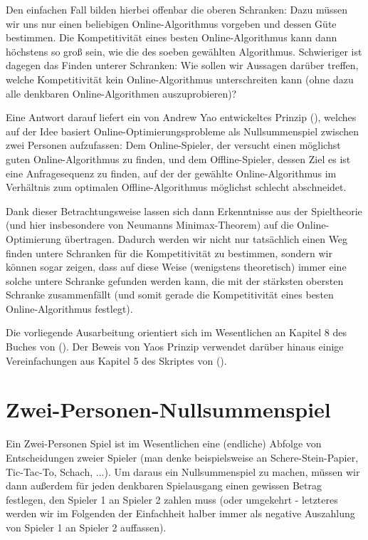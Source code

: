 \documentclass[a4paper,ngerman,12pt,bibtotoc]{scrartcl}
\theoremstyle{definition}
\newtheorem{bsp}[defn]{Beispiel}
\theoremstyle{plain}
\theoremstyle{remark}
\renewcommand{\_}{\mathpunct{.}\,}
\newcommand{\?}{\,{:}\,}
\newcommand{\ZPNS}{Zwei-Personen-Nullsummenspiel }
\begin{document}
	Den einfachen Fall bilden hierbei offenbar die oberen Schranken: Dazu müssen wir uns nur einen beliebigen Online-Algorithmus vorgeben und dessen Güte bestimmen. Die Kompetitivität eines besten Online-Algorithmus kann dann höchstens so groß sein, wie die des soeben gewählten Algorithmus. Schwieriger ist dagegen das Finden unterer Schranken: Wie sollen wir Aussagen darüber treffen, welche Kompetitivität kein Online-Algorithmus unterschreiten kann (ohne dazu alle denkbaren Online-Algorithmen auszuprobieren)?
	
	Eine Antwort darauf liefert ein von Andrew Yao entwickeltes Prinzip (\cite*[Theorem 1]{Yao}), welches auf der Idee basiert Online-Optimierungsprobleme als Nullsummenspiel zwischen zwei Personen aufzufassen: Dem Online-Spieler, der versucht einen möglichst guten Online-Algorithmus zu finden, und dem Offline-Spieler, dessen Ziel es ist eine Anfragesequenz zu finden, auf der der gewählte Online-Algorithmus im Verhältnis zum optimalen Offline-Algorithmus möglichst schlecht abschneidet.
	
	Dank dieser Betrachtungsweise lassen sich dann Erkenntnisse aus der Spieltheorie (und hier insbesondere von Neumanns Minimax-Theorem) auf die Online-Optimierung übertragen. Dadurch werden wir nicht nur tatsächlich einen Weg finden untere Schranken für die Kompetitivität zu bestimmen, sondern wir können sogar zeigen, dass auf diese Weise (wenigstens theoretisch) immer eine solche untere Schranke gefunden werden kann, die mit der stärksten obersten Schranke zusammenfällt (und somit gerade die Kompetitivität eines besten Online-Algorithmus festlegt).
	
	Die vorliegende Ausarbeitung orientiert sich im Wesentlichen an Kapitel 8 des Buches  von \citeauthor{OCCA} (\cite{OCCA}). Der Beweis von Yaos Prinzip verwendet darüber hinaus einige Vereinfachungen aus Kapitel 5 des Skriptes  von \citeauthor{OO} (\cite{OO}).
	

	\section{\ZPNS}
	
	
	Ein Zwei-Personen Spiel ist im Wesentlichen eine (endliche) Abfolge von Entscheidungen zweier Spieler (man denke beispielsweise an Schere-Stein-Papier, Tic-Tac-To, Schach, ...). Um daraus ein Nullsummenspiel zu machen, müssen wir dann außerdem für jeden denkbaren Spielausgang einen gewissen Betrag festlegen, den Spieler 1 an Spieler 2 zahlen muss (oder umgekehrt - letzteres werden wir im Folgenden der Einfachheit halber immer als negative Auszahlung von Spieler 1 an Spieler 2 auffassen). 
	
\end{document}
